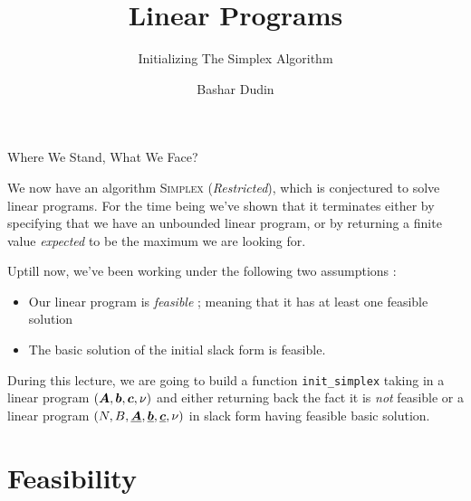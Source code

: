 \documentclass[32pt, aspectratio = 169]{beamer}
\author[BD]{Bashar Dudin}
\institute[]{EPITA}
\title{Linear Programs} %
\subtitle{Initializing The Simplex Algorithm}
\begin{document}
\begin{frame}[plain]
    \titlepage %
\end{frame}

\begin{frame}{Where We Stand, What We Face?}

  We now have an algorithm \textsc{Simplex} (\textit{Restricted}),
  which is conjectured to solve linear programs. For the time being
  we've shown that it terminates either by specifying that we have an
  unbounded linear program, or by returning a finite value
  \textit{expected} to be the maximum we are looking for.

  Uptill now, we've been working under the following two assumptions :
  \begin{itemize}
  \item
    Our linear program is \emph{feasible} ; meaning that it has at
    least one feasible solution
  \item
    The basic solution of the initial slack form is feasible.
  \end{itemize}

  \pause
  During this lecture, we are going to build a function
  \texttt{init_simplex} taking in a linear program
  $(\boldsymbol{A}, \boldsymbol{b}, \boldsymbol{c}, \nu)$ and either returning back the fact
  it is \emph{not} feasible or a linear program
  $(N, B, \underline{\boldsymbol{A}}, \underline{\boldsymbol{b}}, \underline{\boldsymbol{c}},
  \nu)$ in slack form having feasible basic solution.
\end{frame}

\section{Feasibility}
\end{document}
